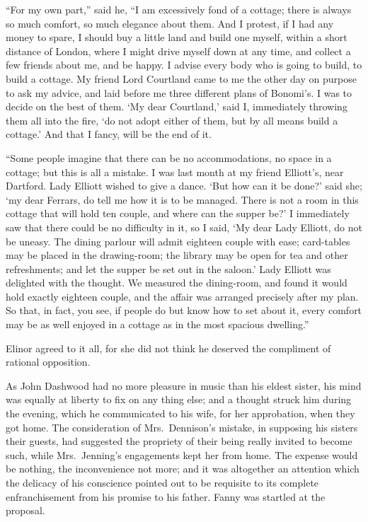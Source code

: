 ``For my own part,'' said he, ``I am excessively fond
of a cottage; there is always so much comfort, so much
elegance about them.  And I protest, if I had any money
to spare, I should buy a little land and build one myself,
within a short distance of London, where I might drive
myself down at any time, and collect a few friends
about me, and be happy.  I advise every body who is going
to build, to build a cottage.  My friend Lord Courtland
came to me the other day on purpose to ask my advice,
and laid before me three different plans of Bonomi's.
I was to decide on the best of them.  `My dear Courtland,'
said I, immediately throwing them all into the fire, `do not
adopt either of them, but by all means build a cottage.'
And that I fancy, will be the end of it.

``Some people imagine that there can be no accommodations,
no space in a cottage; but this is all a mistake.
I was last month at my friend Elliott's, near Dartford.
Lady Elliott wished to give a dance.  `But how can it
be done?' said she; `my dear Ferrars, do tell me how it
is to be managed.  There is not a room in this cottage
that will hold ten couple, and where can the supper be?'
I immediately saw that there could be no difficulty in it,
so I said, `My dear Lady Elliott, do not be uneasy.
The dining parlour will admit eighteen couple with ease;
card-tables may be placed in the drawing-room; the library
may be open for tea and other refreshments; and let the
supper be set out in the saloon.'  Lady Elliott was delighted
with the thought.  We measured the dining-room, and found
it would hold exactly eighteen couple, and the affair
was arranged precisely after my plan.  So that, in fact,
you see, if people do but know how to set about it,
every comfort may be as well enjoyed in a cottage
as in the most spacious dwelling.''

Elinor agreed to it all, for she did not think
he deserved the compliment of rational opposition.

As John Dashwood had no more pleasure in music than his
eldest sister, his mind was equally at liberty to fix on
any thing else; and a thought struck him during the evening,
which he communicated to his wife, for her approbation,
when they got home.  The consideration of Mrs.\ Dennison's
mistake,
in supposing his sisters their guests, had suggested the
propriety of their being really invited to become such,
while Mrs.\ Jenning's engagements kept her from home.
The expense would be nothing, the inconvenience not more;
and it was altogether an attention which the delicacy
of his conscience pointed out to be requisite to its
complete enfranchisement from his promise to his father.
Fanny was startled at the proposal.

